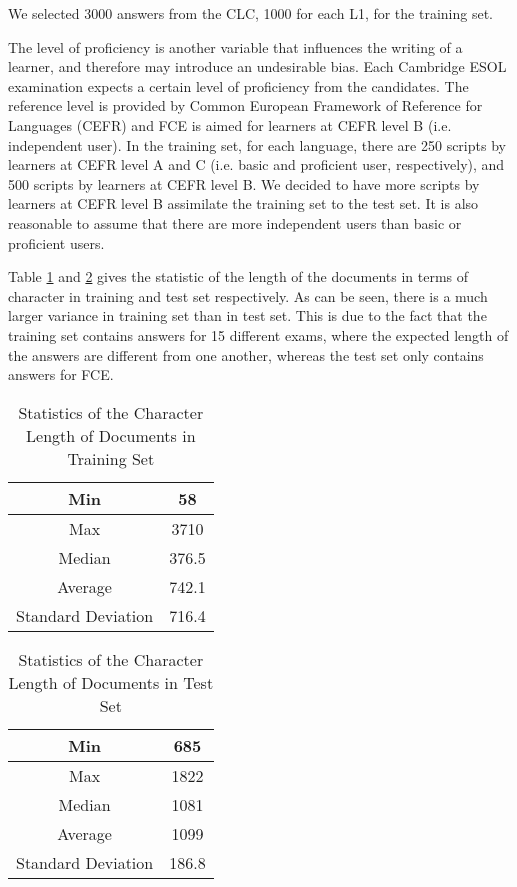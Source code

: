 We selected 3000 answers from the CLC, 1000 for each L1, for the training set.

The level of proficiency is another variable that influences the writing of a learner, and therefore may introduce an undesirable bias.
Each Cambridge ESOL examination expects a certain level of proficiency from the candidates.
The reference level is provided by Common European Framework of Reference for Languages (CEFR) \citep{council2001common} and FCE is aimed for learners at CEFR level B (i.e. independent user).
In the training set, for each language, there are 250 scripts by learners at CEFR level A and C (i.e. basic and proficient user, respectively), and 500 scripts by learners at CEFR level B.
We decided to have more scripts by learners at CEFR level B assimilate the training set to the test set.
It is also reasonable to assume that there are more independent users than basic or proficient users.

Table \ref{tab:tr-stat} and \ref{tab:te-stat} gives the statistic of the length of the documents in terms of character in training and test set respectively.
As can be seen, there is a much larger variance in training set than in test set.
This is due to the fact that the training set contains answers for 15 different exams, where the expected length of the answers are different from one another, whereas the test set only contains answers for FCE.
\begin{table}[]
\centering
\caption{Statistics of the Character Length of Documents in Training Set}
\label{tab:tr-stat}
\begin{tabular}{|c|c|}
\hline
Min         & 58 \\ \hline
Max      & 3710     \\ \hline
Median    & 376.5    \\ \hline
Average & 742.1   \\ \hline
Standard Deviation    & 716.4   \\ \hline
\end{tabular}
\end{table}
\begin{table}[]
\centering
\caption{Statistics of the Character Length of Documents in Test Set}
\label{tab:te-stat}
\begin{tabular}{|c|c|}
\hline
Min         & 685\\ \hline
Max      & 1822     \\ \hline
Median    & 1081   \\ \hline
Average & 1099    \\ \hline
Standard Deviation    & 186.8    \\ \hline
\end{tabular}
\end{table}
